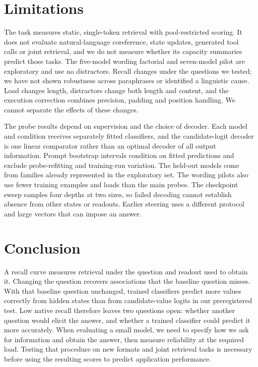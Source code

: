 \documentclass{article}
\begin{document}
\section{Limitations}\label{sec:limits}
The task measures static, single-token retrieval with pool-restricted scoring.
It does not evaluate natural-language coreference, state updates, generated tool calls or joint retrieval, and we do not measure whether its capacity summaries predict those tasks.
The five-model wording factorial and seven-model pilot are exploratory and use no distractors.
Recall changes under the questions we tested; we have not shown robustness across paraphrases or identified a linguistic cause.
Load changes length, distractors change both length and content, and the execution correction combines precision, padding and position handling.
We cannot separate the effects of these changes.

The probe results depend on supervision and the choice of decoder.
Each model and condition receives separately fitted classifiers, and the candidate-logit decoder is one linear comparator rather than an optimal decoder of all output information.
Prompt bootstrap intervals condition on fitted predictions and exclude probe-refitting and training-run variation.
The held-out models come from families already represented in the exploratory set.
The wording pilots also use fewer training examples and loads than the main probes.
The checkpoint sweep samples four depths at two sizes, so failed decoding cannot establish absence from other states or readouts.
Earlier steering uses a different protocol and large vectors that can impose an answer.

\section{Conclusion}\label{sec:conclusion}
A recall curve measures retrieval under the question and readout used to obtain it.
Changing the question recovers associations that the baseline question misses.
With that baseline question unchanged, trained classifiers predict more values correctly from hidden states than from candidate-value logits in our preregistered test.
Low native recall therefore leaves two questions open: whether another question would elicit the answer, and whether a trained classifier could predict it more accurately.
When evaluating a small model, we need to specify how we ask for information and obtain the answer, then measure reliability at the required load.
Testing that procedure on new formats and joint retrieval tasks is necessary before using the resulting scores to predict application performance.
\end{document}
